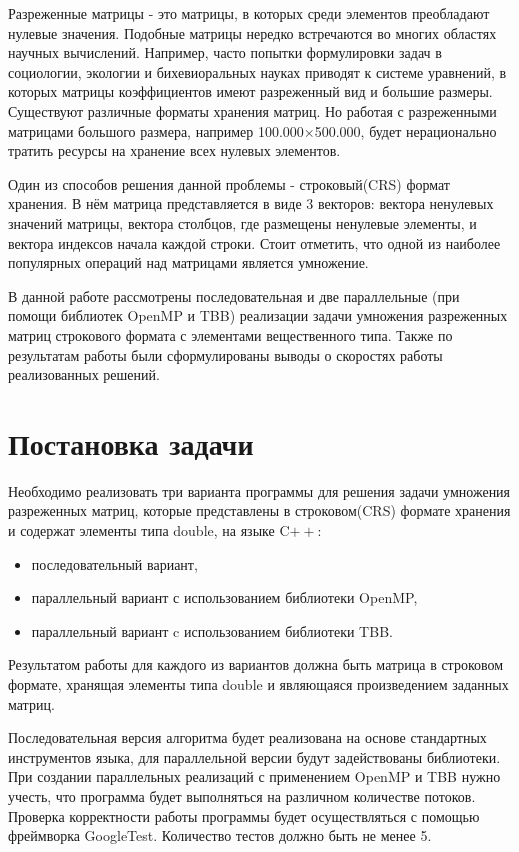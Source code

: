 \documentclass[14pt, russian]{extarticle}
\begin{document}
    Разреженные матрицы - это матрицы, в которых среди элементов преобладают нулевые значения. Подобные матрицы нередко встречаются во многих областях научных вычислений. Например, часто попытки формулировки задач в социологии, экологии и бихевиоральных науках приводят к системе уравнений, в которых матрицы коэффициентов имеют разреженный вид и большие размеры.  Существуют различные форматы хранения матриц. Но работая с разреженными матрицами большого размера, например 100{.}000$\times$500{.}000, будет нерационально тратить ресурсы на хранение всех нулевых элементов.

    Один из способов решения данной проблемы - строковый(CRS) формат хранения. В нём матрица представляется в виде 3 векторов: вектора ненулевых значений матрицы, вектора столбцов, где размещены ненулевые элементы, и вектора индексов начала каждой строки. Стоит отметить, что одной из наиболее популярных операций над матрицами является умножение.

	В данной работе рассмотрены последовательная и две параллельные (при помощи библиотек OpenMP и TBB) реализации задачи умножения разреженных матриц строкового формата с элементами вещественного типа. Также по результатам работы были сформулированы выводы о скоростях работы реализованных решений.
	\newpage

	\section{Постановка задачи}
	Необходимо реализовать три варианта программы для решения задачи умножения разреженных матриц, которые представлены в строковом(CRS) формате хранения и содержат элементы типа double, на языке C$++$: 
    \begin{itemize}
    \item{последовательный вариант,}
    \item{параллельный вариант с использованием библиотеки OpenMP,}
    \item{параллельный вариант c использованием библиотеки TBB.}
    \end{itemize}
	
	Результатом работы для каждого из вариантов должна быть матрица в строковом формате, хранящая элементы типа double и являющаяся произведением заданных матриц.
	
	Последовательная версия алгоритма будет реализована на основе стандартных инструментов языка, для параллельной версии будут задействованы библиотеки. При создании параллельных реализаций с применением OpenMP и TBB нужно учесть, что программа будет выполняться на различном количестве потоков. Проверка корректности работы программы будет осуществляться с помощью фреймворка GoogleTest. Количество тестов должно быть не менее 5.
	
\end{document}
